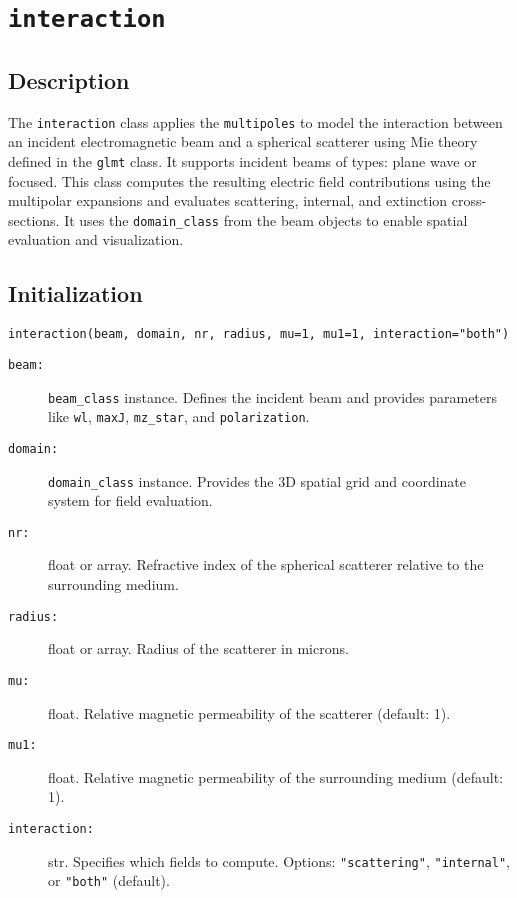 \section{\texttt{interaction}}

\subsection{Description}
The \texttt{interaction} class applies the \texttt{multipoles} to model the interaction between an incident electromagnetic beam and a spherical scatterer using Mie theory defined in the \texttt{glmt} class. It supports incident beams of types: plane wave or focused. This class computes the resulting electric field contributions using the multipolar expansions and evaluates scattering, internal, and extinction cross-sections. It uses the \texttt{domain\_class} from the beam objects to enable spatial evaluation and visualization.

\subsection{Initialization}
\begin{verbatim}
interaction(beam, domain, nr, radius, mu=1, mu1=1, interaction="both")
\end{verbatim}

\begin{description}
    \item[\texttt{beam:}] \texttt{beam\_class} instance. Defines the incident beam and provides parameters like \texttt{wl}, \texttt{maxJ}, \texttt{mz\_star}, and \texttt{polarization}.
    \item[\texttt{domain:}] \texttt{domain\_class} instance. Provides the 3D spatial grid and coordinate system for field evaluation.
    \item[\texttt{nr:}] float or array. Refractive index of the spherical scatterer relative to the surrounding medium.
    \item[\texttt{radius:}] float or array. Radius of the scatterer in microns.
    \item[\texttt{mu:}] float. Relative magnetic permeability of the scatterer (default: 1).
    \item[\texttt{mu1:}] float. Relative magnetic permeability of the surrounding medium (default: 1).
    \item[\texttt{interaction:}] str. Specifies which fields to compute. Options: \texttt{"scattering"}, \texttt{"internal"}, or \texttt{"both"} (default).
\end{description}


